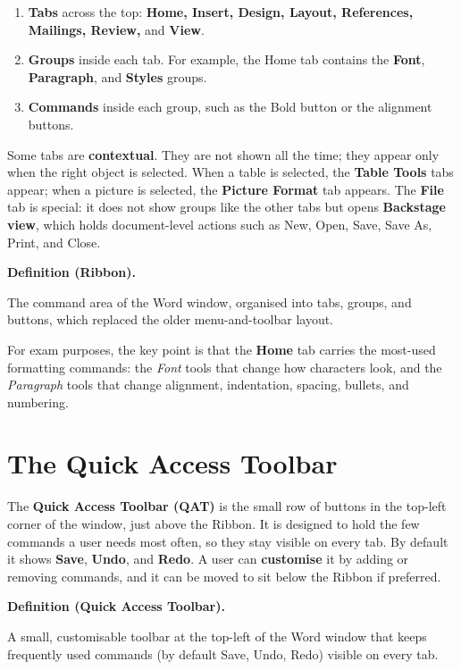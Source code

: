 \documentclass[11pt]{article}
\newenvironment{definitionbox}[1]{%
  \par\noindent\textbf{Definition (#1).}\ \itshape
}{\par\vspace{0.3em}}
\begin{document}
\begin{enumerate}
  \item \textbf{Tabs} across the top: \textbf{Home, Insert, Design, Layout,
    References, Mailings, Review,} and \textbf{View}.
  \item \textbf{Groups} inside each tab. For example, the Home tab contains
    the \textbf{Font}, \textbf{Paragraph}, and \textbf{Styles} groups.
  \item \textbf{Commands} inside each group, such as the Bold button or the
    alignment buttons.
\end{enumerate}

Some tabs are \textbf{contextual}. They are not shown all the time; they
appear only when the right object is selected. When a table is selected, the
\textbf{Table Tools} tabs appear; when a picture is selected, the
\textbf{Picture Format} tab appears. The \textbf{File} tab is special: it
does not show groups like the other tabs but opens \textbf{Backstage view},
which holds document-level actions such as New, Open, Save, Save As, Print,
and Close.

\begin{definitionbox}{Ribbon}
The command area of the Word window, organised into tabs, groups, and
buttons, which replaced the older menu-and-toolbar layout.
\end{definitionbox}

For exam purposes, the key point is that the \textbf{Home} tab carries the
most-used formatting commands: the \emph{Font} tools that change how
characters look, and the \emph{Paragraph} tools that change alignment,
indentation, spacing, bullets, and numbering.

\section{The Quick Access Toolbar}
The \textbf{Quick Access Toolbar (QAT)} is the small row of buttons in the
top-left corner of the window, just above the Ribbon. It is designed to hold
the few commands a user needs most often, so they stay visible on every tab.
By default it shows \textbf{Save}, \textbf{Undo}, and \textbf{Redo}. A user
can \textbf{customise} it by adding or removing commands, and it can be moved
to sit below the Ribbon if preferred.

\begin{definitionbox}{Quick Access Toolbar}
A small, customisable toolbar at the top-left of the Word window that keeps
frequently used commands (by default Save, Undo, Redo) visible on every tab.
\end{definitionbox}
\end{document}
